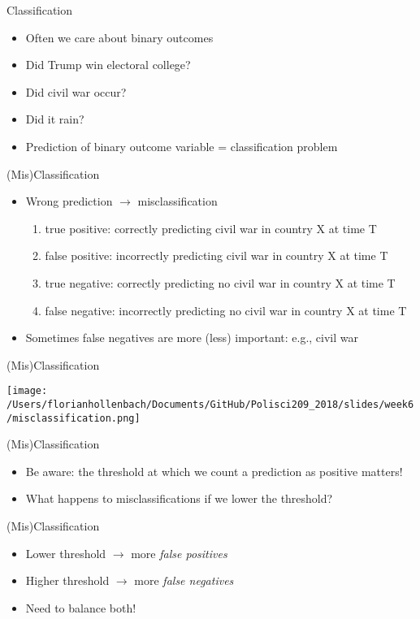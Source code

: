 \documentclass[presentation]{beamer}
\begin{document}
\begin{frame}[label={sec:org9a378b3}]{Classification}
\begin{itemize}
\item Often we care about binary outcomes
\item Did Trump win electoral college?
\item Did civil war occur?
\item Did it rain?

\item \alert{Prediction of binary outcome variable = classification problem}
\end{itemize}
\end{frame}


\begin{frame}[label={sec:orgd7700db}]{(Mis)Classification}
\begin{itemize}
\item Wrong prediction \(\rightarrow\) misclassification
\begin{enumerate}
\item true positive: correctly predicting civil war in country X at time T
\item false positive: incorrectly predicting civil war in country X at time T
\item true negative: correctly predicting \alert{no} civil war in country X at time T
\item false negative: incorrectly predicting \alert{no} civil war in country X at time T
\end{enumerate}

\item Sometimes false negatives are more (less) important: e.g., civil war
\end{itemize}
\end{frame}


\begin{frame}[label={sec:org785a2f9}]{(Mis)Classification}
\begin{center}
\texttt{[image: /Users/florianhollenbach/Documents/GitHub/Polisci209\_2018/slides/week6/misclassification.png]}
\end{center}
\end{frame}


\begin{frame}[label={sec:orgff0d2d0}]{(Mis)Classification}
\begin{itemize}
\item Be aware: the threshold at which we count a prediction as positive matters!
\item What happens to misclassifications if we lower the threshold?
\end{itemize}
\end{frame}

\begin{frame}[label={sec:org5521697}]{(Mis)Classification}
\begin{itemize}
\item Lower threshold \(\rightarrow\) more \emph{false positives}
\item Higher threshold \(\rightarrow\) more \emph{false negatives}
\item Need to balance both!
\end{itemize}
\end{frame}
\end{document}
